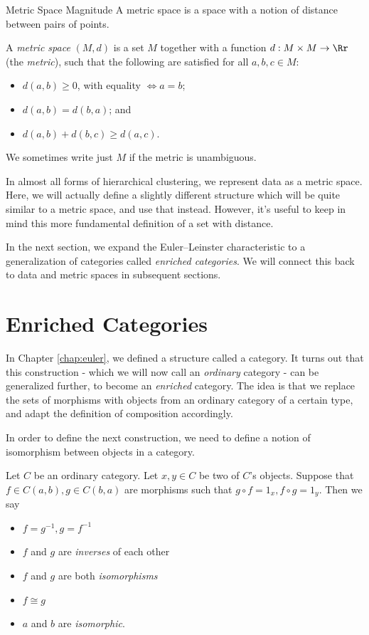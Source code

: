\documentclass[12pt]{pom_thesis}
\begin{document}
\begin{chapter}{Metric Space Magnitude}
A metric space is a space with a notion of distance between pairs of points. 
\begin{defn}
A \textit{metric space} $(M,d)$ is a set $M$ together with a function  $d:M \times M \rightarrow \Rr$ (the \emph{metric}), such that the following are satisfied for all $a,b,c \in M$:
\begin{itemize}
\item $d(a,b) \geq 0$, with equality $\iff a = b$;
\item $d(a,b) = d(b,a)$; and
\item $d(a,b) + d(b,c) \geq d(a,c)$.
\end{itemize}
We sometimes write just $M$ if the metric is unambiguous.
\end{defn}

In almost all forms of hierarchical clustering, we represent data as a metric space. Here, we will actually define a slightly different structure which will be quite similar to a metric space, and use that instead. However, it's useful to keep in mind this more fundamental definition of a set with distance.

In the next section, we expand the Euler--Leinster characteristic to a generalization of categories called \emph{enriched categories}. We will connect this back to data and metric spaces in subsequent sections.
\section{Enriched Categories}
In Chapter \ref{chap:euler}, we defined a structure called a category. It turns out that this construction - which we will now call an \emph{ordinary} category - can be generalized further, to become an \emph{enriched} category. The idea is that we replace the sets of morphisms with objects from an ordinary category of a certain type, and adapt the definition of composition accordingly. 

In order to define the next construction, we need to define a notion of isomorphism between objects in a category.
\begin{defn}
Let $C$ be an ordinary category. Let $x,y \in C$ be two of $C$'s objects. Suppose that $f \in C(a,b), g \in C(b,a)$ are morphisms such that $g \circ f = 1_x, f \circ g = 1_y$. Then we say
\begin{itemize}
\item $f = g^{-1}, g = f^{-1}$
\item $f$ and $g$ are \emph{inverses} of each other
\item $f$ and $g$ are both \emph{isomorphisms}
\item $f \cong g$
\item $a$ and $b$ are \emph{isomorphic}.
\end{itemize}
\end{defn}


\end{chapter}
\end{document}
